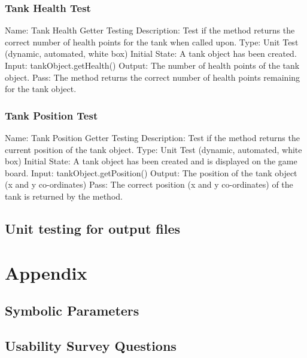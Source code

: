 \documentclass{article}
\begin{document}
\subsubsection{Tank Health Test}
Name: Tank Health Getter Testing\newline
Description: Test if the method returns the correct number of health points for the tank when called upon.\newline
Type: Unit Test (dynamic, automated, white box)\newline
Initial State: A tank object has been created.\newline
Input: tankObject.getHealth()\newline
Output: The number of health points of the tank object.\newline
Pass: The method returns the correct number of health points remaining for the tank object.\newline

\subsubsection{Tank Position Test}
Name: Tank Position Getter Testing\newline
Description: Test if the method returns the current position of the tank object.\newline
Type: Unit Test (dynamic, automated, white box)\newline
Initial State: A tank object has been created and is displayed on the game board.\newline
Input: tankObject.getPosition()\newline
Output: The position of the tank object (x and y co-ordinates)\newline
Pass: The correct position (x and y co-ordinates) of the tank is returned by the method.\newline


\subsection{Unit testing for output files}

\section{Appendix}
\subsection{Symbolic Parameters}
\subsection{Usability Survey Questions}
\end{document}

